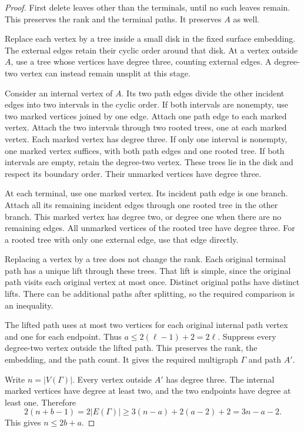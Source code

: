 \begin{proof}
First delete leaves other than the terminals, until no such leaves remain.
This preserves the rank and the terminal paths.
It preserves $A$ as well.

Replace each vertex by a tree inside a small disk in the fixed surface embedding.
The external edges retain their cyclic order around that disk.
At a vertex outside $A$, use a tree whose vertices have degree three, counting external edges.
A degree-two vertex can instead remain unsplit at this stage.

Consider an internal vertex of $A$.
Its two path edges divide the other incident edges into two intervals in the cyclic order.
If both intervals are nonempty, use two marked vertices joined by one edge.
Attach one path edge to each marked vertex.
Attach the two intervals through two rooted trees, one at each marked vertex.
Each marked vertex has degree three.
If only one interval is nonempty, one marked vertex suffices, with both path edges and one rooted tree.
If both intervals are empty, retain the degree-two vertex.
These trees lie in the disk and respect its boundary order.
Their unmarked vertices have degree three.

At each terminal, use one marked vertex.
Its incident path edge is one branch.
Attach all its remaining incident edges through one rooted tree in the other branch.
This marked vertex has degree two, or degree one when there are no remaining edges.
All unmarked vertices of the rooted tree have degree three.
For a rooted tree with only one external edge, use that edge directly.

Replacing a vertex by a tree does not change the rank.
Each original terminal path has a unique lift through these trees.
That lift is simple, since the original path visits each original vertex at most once.
Distinct original paths have distinct lifts.
There can be additional paths after splitting, so the required comparison is an inequality.

The lifted path uses at most two vertices for each original internal path vertex and one for each endpoint.
Thus $a\le2(\ell-1)+2=2\ell$.
Suppress every degree-two vertex outside the lifted path.
This preserves the rank, the embedding, and the path count.
It gives the required multigraph $\Gamma$ and path $A'$.

Write $n=|V(\Gamma)|$.
Every vertex outside $A'$ has degree three.
The internal marked vertices have degree at least two, and the two endpoints have degree at least one.
Therefore
\[
 2(n+b-1)=2|E(\Gamma)|\ge3(n-a)+2(a-2)+2=3n-a-2.
\]
This gives $n\le2b+a$.
\end{proof}

